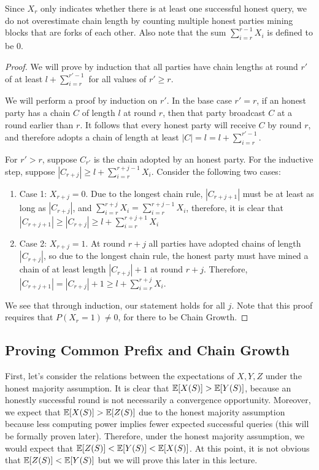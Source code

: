 Since $X_r$ only indicates whether there is at least one successful honest query, we do not overestimate chain length by counting multiple honest parties mining blocks that are forks of each other.
Also note that the sum $\sum_{i=r}^{r-1} X_i$ is defined to be $0$.

\begin {proof}
We will prove by induction that all parties have chain lengths at round $r'$ of at least $l + \sum_{i=r}^{r'-1}$ for all values of $r' \geq r$.

We will perform a proof by induction on $r'$. In the base case $r'=r$,
if an honest party has a chain $C$ of length $l$ at round $r$, then that party broadcast $C$ at a round earlier than $r$. It follows that every honest party will receive $C$ by round $r$, and therefore adopts a chain of length at least
$|C| = l = l + \sum_{i=r}^{r'-1}$.

For $r'>r$, suppose $C_{r'}$ is the chain adopted by an honest party.
For the inductive step, suppose $|C_{r+j}| \geq l + \sum_{i=r}^{r+j-1} X_i$. Consider the following two cases:
\begin{enumerate}
\item Case 1: $X_{r+j} = 0$. Due to the longest chain rule, $|C_{r + j + 1}|$ must be at least as long as $|C_{r+j}|$, and $\sum_{i=r}^{r+j} X_i = \sum_{i=r}^{r+j - 1} X_i$, therefore, it is clear that $|C_{r+j+1}| \geq |C_{r+j}| \geq l + \sum_{i=r}^{r + j + 1} X_i$
\item Case 2: $X_{r+j} = 1$. At round $r + j$ all parties have adopted chains of length $|C_{r+j}|$, so due to the longest chain rule, the honest party must have mined a chain of at least length $|C_{r+j}| + 1$ at round $r + j$. Therefore, $|C_{r + j + 1}| = |C_{r + j}| + 1 \geq l + \sum_{i=r}^{r + j} X_i$.
\end{enumerate}
We see that through induction, our statement holds for all $j$.
Note that this proof requires that $P(X_r = 1) \not = 0$, for there to be Chain Growth.

\end {proof}
\subsection{Proving Common Prefix and Chain Growth}

First, let's consider the relations between the expectations of $X, Y, Z$ under the honest majority assumption. It is clear that $\mathbb{E}[X(S)] > \mathbb{E}[Y(S)]$, because an honestly successful round is not necessarily a convergence opportunity. Moreover, we expect that $\mathbb{E}[X(S)] > \mathbb{E}[Z(S)]$ due to the honest majority assumption because less computing power implies fewer expected successful queries (this will be formally proven later). Therefore, under the honest majority assumption, we would expect that $\mathbb{E}[Z(S)] < \mathbb{E}[Y(S)] < \mathbb{E}[X(S)]$.
At this point, it is not obvious that $\mathbb{E}[Z(S)] < \mathbb{E}[Y(S)]$ but we will prove this later in this lecture.

